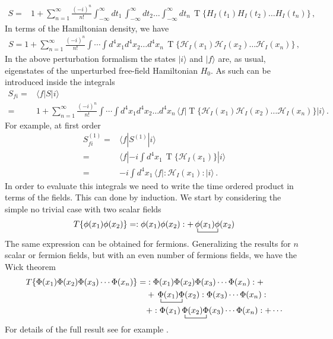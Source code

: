 \begin{align}
   S=&1+\sum_{n=1}^\infty\frac{(-i)^n}{n!}\int_{-\infty}^{\infty}d t_1\,\int_{-\infty}^{\infty} d t_2\ldots\int_{-\infty}^{\infty}d t_n\,\operatorname{T}\{{H}_I(t_1){H}_I(t_2)\ldots{H}_I(t_n)\}\,, 
\end{align}
In terms of the Hamiltonian density, we have
\begin{align}
  S=1+\sum_{n=1}^\infty\frac{(-i)^n}{n!}\int\cdots\int d^4x_1 d^4x_2\ldots d^4x_n\,\operatorname{T}\{\mathcal{H}_I(x_1)\mathcal{H}_I(x_2)\ldots\mathcal{H}_I(x_n)\}\,, 
\end{align}
In the above perturbation formalism the states $|i\rangle$ and $|f\rangle$ are, as usual, eigenstates of the unperturbed free-field Hamiltonian $H_0$. As such can be introduced inside the integrals
\begin{align}
  S_{f i}=&\langle f|S|i\rangle\nonumber\\
  =&1+\sum_{n=1}^\infty\frac{(-i)^n}{n!}\int\cdots\int d^4x_1 d^4x_2\ldots d^4x_n\,\langle f|\operatorname{T}\{\mathcal{H}_I(x_1)\mathcal{H}_I(x_2)\ldots\mathcal{H}_I(x_n)\}|i\rangle\,.
\end{align}
For example, at first order
\begin{align}
  \label{eq:96}
  S_{fi}^{(1)}=&\langle f|S^{(1)}|i\rangle\nonumber\\
  =&\langle f|-i\int d^4x_1\,\operatorname{T}\{\mathcal{H}_I(x_1)\}|i\rangle\nonumber\\
  =&-i\int d^4x_1\,\langle f|:\mathcal{H}_I(x_1):|i\rangle\,.
\end{align}
In order to evaluate this integrals we need to write the time ordered product in terms of the fields. This can done by induction. We start by considering the simple no trivial case with two scalar fields
\begin{align}
  T\{\phi(x_1)\phi(x_2)\}=:\phi(x_1)\phi(x_2):+\bcontraction{\,}{\phi}{(x_1)}{\phi}
\,\phi(x_1)\phi(x_2)
\end{align}
The same expression can be obtained for fermions. Generalizing  the results for $n$ scalar or fermion fields, but with an even number of fermions fields, we have the Wick theorem
\begin{align}
  T\{\Phi(x_1)\Phi(x_2)\Phi(x_3)\cdots\Phi(x_n) \}
=&:\Phi(x_1)\Phi(x_2)\Phi(x_3)\cdots\Phi(x_n):+\nonumber\\
&+\bcontraction{\,}{\Phi}{(x_1)}{\Phi}\,\Phi(x_1)\Phi(x_2):\Phi(x_3)\cdots\Phi(x_n):\nonumber\\
&+:\Phi(x_1)\bcontraction{\,}{\Phi}{(x_2)}{\Phi}\,\Phi(x_2)\Phi(x_3)\cdots\Phi(x_n):+\cdots 
\end{align}
For details of the full result see for example \cite{Lahiri:2005sm}.


